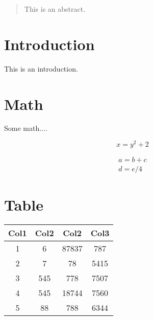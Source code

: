 \documentclass[12pt]{article}
\begin{document}
\begin{abstract}
This is an abstract.
\end{abstract}

\section*{Introduction}

This is an introduction.

\section{Math}
Some math....



\begin{equation}
x  = y^2 + 2
\end{equation}

\begin{multline*}
a = b + c \\
d = e / 4
\end{multline*}

\section{Table}
\begin{center}
\begin{tabular}{|c |c |c c|} 
 \hline
 Col1 & Col2 & Col2 & Col3 \\ [0.5ex] 
 \hline\hline
 1 & 6 & 87837 & 787 \\ 
 \hline
 2 & 7 & 78 & 5415 \\
 \hline
 3 & 545 & 778 & 7507 \\
 \hline
 4 & 545 & 18744 & 7560 \\
 \hline
 5 & 88 & 788 & 6344 \\ [1ex] 
 \hline
\end{tabular}
\end{center}
\end{document}
